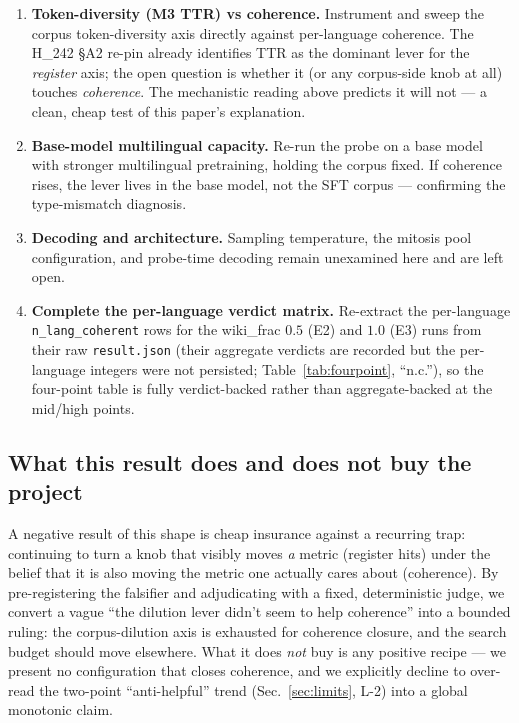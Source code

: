 \documentclass[11pt,a4paper]{article}
\begin{document}
\begin{enumerate}\itemsep0.3em
\item \textbf{Token-diversity (M3 TTR) vs coherence.} Instrument and
  sweep the corpus token-diversity axis directly against per-language
  coherence. The H\_242 \S A2 re-pin already identifies TTR as the
  dominant lever for the \emph{register} axis; the open question is
  whether it (or any corpus-side knob at all) touches \emph{coherence}.
  The mechanistic reading above predicts it will not --- a clean, cheap
  test of this paper's explanation.
\item \textbf{Base-model multilingual capacity.} Re-run the probe on a
  base model with stronger multilingual pretraining, holding the corpus
  fixed. If coherence rises, the lever lives in the base model, not the
  SFT corpus --- confirming the type-mismatch diagnosis.
\item \textbf{Decoding and architecture.} Sampling temperature, the
  mitosis pool configuration, and probe-time decoding remain unexamined
  here and are left open.
\item \textbf{Complete the per-language verdict matrix.} Re-extract the
  per-language \texttt{n\_lang\_coherent} rows for the wiki\_frac $0.5$
  (E2) and $1.0$ (E3) runs from their raw \texttt{result.json} (their
  aggregate verdicts are recorded but the per-language integers were not
  persisted; Table~\ref{tab:fourpoint}, ``n.c.''), so the four-point
  table is fully verdict-backed rather than aggregate-backed at the
  mid/high points.
\end{enumerate}

\subsection{What this result does and does not buy the project}

A negative result of this shape is cheap insurance against a recurring
trap: continuing to turn a knob that visibly moves \emph{a} metric
(register hits) under the belief that it is also moving the metric one
actually cares about (coherence). By pre-registering the falsifier and
adjudicating with a fixed, deterministic judge, we convert a vague ``the
dilution lever didn't seem to help coherence'' into a bounded ruling: the
corpus-dilution axis is exhausted for coherence closure, and the search
budget should move elsewhere. What it does \emph{not} buy is any positive
recipe --- we present no configuration that closes coherence, and we
explicitly decline to over-read the two-point ``anti-helpful'' trend
(Sec.~\ref{sec:limits}, L-2) into a global monotonic claim.
\end{document}
